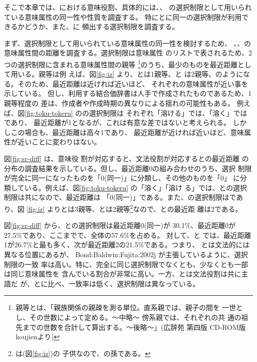 \documentclass[japanese]{jnlp}
\newcommand{\izj}[1]{}
\newcommand{\abs}{}
\newcommand{\sbj}{}
\newcommand{\obj}{}
\newcommand{\ix}{}
\newcommand{\soalt}{}
\newcommand{\citep}{}
\newcommand{\citet}{}
\newcommand{\tot}{}
\begin{document}
そこで本章では、\soalt における意味役割、具体的には\abs{}、\obj{}、
\sbj{}の選択制限として用いられている意味属性の同一性や性質を調査する。
特に\sbj{}と\obj{}に同一の選択制限が利用できるかどうか、また、\abs に
頻出する選択制限を調査する。


まず、選択制限として用いられている意味属性の同一性を検討するため、
\abs{}、\obj{}、\sbj{}の意味属性間の距離を調査する。選択制限は意味属性
のリストで表されるため、2つの選択制限に含まれる意味属性間の親等
\footnote{親等とは、「親族関係の親疎を測る単位。直系親では、親子の間を
  一世とし、その世数によって定める。〜中略〜 傍系親では、それぞれの共
  通の祖先までの世数を合計して算出する。〜後略〜」(広辞苑 第四版
  CD-ROM版\citep{koujien}より)}のうち、最少のものを最近距離として用いる。親等は例
えば、図\ref{fig:iz} より、\izj{名詞}と\izj{具体}は1親等、\izj{名詞}と
\izj{主体}は2親等、のようになる。そのため、最近距離は近ければ近いほど、
それぞれの意味属性が近い事を示している。
但し、利用する結合価辞書は人手で作成されたものであるため、1親等程度の
差は、作成者や作成時期の異なりによる揺れの可能性もある。
例えば、図\ref{fig:toku-tokeru} の\ix{}の選択制限は
それぞれ「溶ける」では\izj{具体物}、「溶く」では\izj{無生物}であり、
最近距離が1となるが、これは有意な差ではないと考えられる。
しかしこの場合も、最近距離は高々1であり、
最近距離が近ければ近いほど、意味属性が近いことに変わりはない。

図\ref{fig:sr-diff} は、意味役
割が対応する\abs{}と\sbj{}、文法役割が対応する\obj{}と\sbj{}の最近距離
の分布の調査結果を示している。但し、最近距離0の組み合わせのうち、選択
制限が完全に同一になったものを「0(同一)」に分類し、その他のものを「0」
に分類している。例えば、図\ref{fig:toku-tokeru} の「溶く」\tot{}「溶け
る」では、\sbj{}と\obj{}の選択制限は共に\izj{具体物}なので、最近距離は
「0(同一)」である。また、\abs{}の選択制限は\izj{人 人工物}であり、図
\ref{fig:iz} より\izj{人}と\izj{具体物}は3親等、\izj{人工物}と\izj{具
  体物}は2親等\footnote{\izj {人工物}は\izj{無生物}(図\ref{fig:iz})の
  子供なので、\izj{具体物}の孫である。}なので、\abs{}と\sbj{}の最近距
離は2である。


図\ref{fig:sr-diff} から、\obj{}と\sbj{}の選択制限は最近距離0(同一)が
30.1\%、最近距離0が27.5\%であり、ここまでで、全体の57.6\%を占める。
対して、\abs{}と
\sbj{}では、最近距離1が26.7\%と最も多く、次が最近距離2の21.5\%である。つまり、
\obj{}と\sbj{}は文法的には異なる位置にあるが、
\citet{Bond:Baldwin:Fujita:2002j} が主張しているように、選択制限の一致
率は高い。特に、完全に同じ選択制限でなくとも、少なくとも一部は同じ意味属性を
含んでいる割合が非常に高い。一方、\abs{}と\sbj{}は文法役割は共に主語だ
が、\obj{}と\sbj{}に比べ、一致率は低く、選択制限は異なっている。
\end{document}
